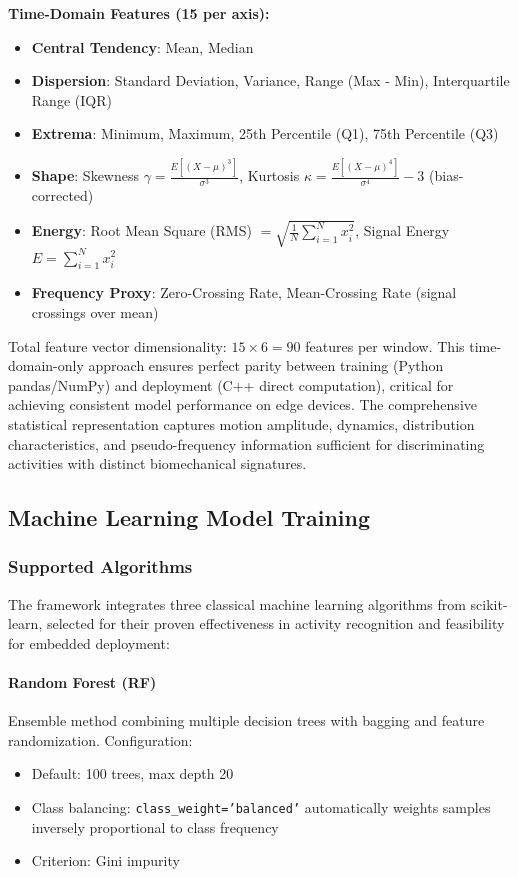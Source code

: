 \textbf{Time-Domain Features (15 per axis):}
\begin{itemize}
    \item \textbf{Central Tendency}: Mean, Median
    \item \textbf{Dispersion}: Standard Deviation, Variance, Range (Max - Min), Interquartile Range (IQR)
    \item \textbf{Extrema}: Minimum, Maximum, 25th Percentile (Q1), 75th Percentile (Q3)
    \item \textbf{Shape}: Skewness $\gamma = \frac{E[(X-\mu)^3]}{\sigma^3}$, Kurtosis $\kappa = \frac{E[(X-\mu)^4]}{\sigma^4} - 3$ (bias-corrected)
    \item \textbf{Energy}: Root Mean Square (RMS) $= \sqrt{\frac{1}{N}\sum_{i=1}^{N} x_i^2}$, Signal Energy $E = \sum_{i=1}^{N} x_i^2$
    \item \textbf{Frequency Proxy}: Zero-Crossing Rate, Mean-Crossing Rate (signal crossings over mean)
\end{itemize}

Total feature vector dimensionality: $15 \times 6 = 90$ features per window. This time-domain-only approach ensures perfect parity between training (Python pandas/NumPy) and deployment (C++ direct computation), critical for achieving consistent model performance on edge devices. The comprehensive statistical representation captures motion amplitude, dynamics, distribution characteristics, and pseudo-frequency information sufficient for discriminating activities with distinct biomechanical signatures.

\subsection{Machine Learning Model Training}

\subsubsection{Supported Algorithms}
The framework integrates three classical machine learning algorithms from scikit-learn, selected for their proven effectiveness in activity recognition and feasibility for embedded deployment:

\paragraph{Random Forest (RF)}
Ensemble method combining multiple decision trees with bagging and feature randomization. Configuration:
\begin{itemize}
    \item Default: 100 trees, max depth 20
    \item Class balancing: \texttt{class\_weight='balanced'} automatically weights samples inversely proportional to class frequency
    \item Criterion: Gini impurity
\end{itemize}


